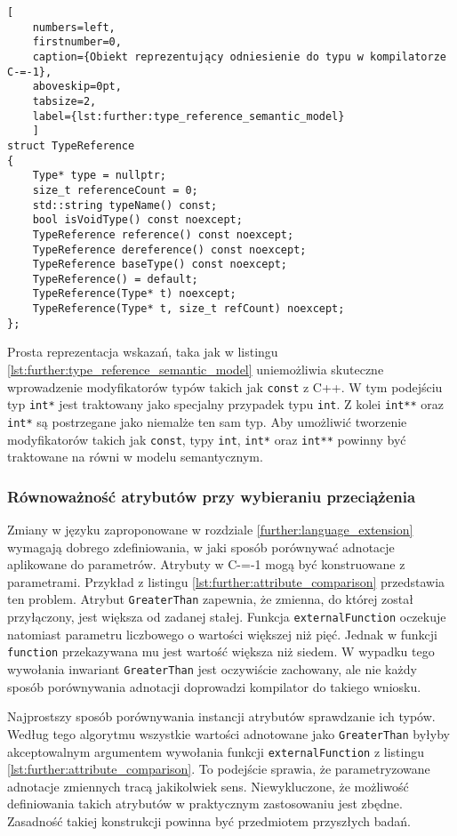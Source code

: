\begin{lstlisting}[
	numbers=left,
	firstnumber=0,
	caption={Obiekt reprezentujący odniesienie do typu w kompilatorze C-=-1},
	aboveskip=0pt,
	tabsize=2,
	label={lst:further:type_reference_semantic_model}
	]
struct TypeReference
{
	Type* type = nullptr;
	size_t referenceCount = 0;
	std::string typeName() const;
	bool isVoidType() const noexcept;
	TypeReference reference() const noexcept;
	TypeReference dereference() const noexcept;
	TypeReference baseType() const noexcept;
	TypeReference() = default;
	TypeReference(Type* t) noexcept;
	TypeReference(Type* t, size_t refCount) noexcept;
};
\end{lstlisting}

Prosta reprezentacja wskazań, taka jak w listingu \ref{lst:further:type_reference_semantic_model} uniemożliwia skuteczne wprowadzenie modyfikatorów typów takich jak \lstinline{const} z C++.
W tym podejściu typ \lstinline{int*} jest traktowany jako specjalny przypadek typu \lstinline{int}.
Z kolei \lstinline{int**} oraz \lstinline{int*} są postrzegane jako niemalże ten sam typ.
Aby umożliwić tworzenie modyfikatorów takich jak \lstinline{const}, typy \lstinline{int}, \lstinline{int*} oraz \lstinline{int**} powinny być traktowane na równi w modelu semantycznym.

\subsubsection{Równoważność atrybutów przy wybieraniu przeciążenia}
\label{further:adnotated_type_system:attribute_equivalence}

Zmiany w języku zaproponowane w rozdziale \ref{further:language_extension} wymagają dobrego zdefiniowania, w jaki sposób porównywać adnotacje aplikowane do parametrów.
Atrybuty w C-=-1 mogą być konstruowane z parametrami.
Przykład z listingu \ref{lst:further:attribute_comparison} przedstawia ten problem.
Atrybut \lstinline{GreaterThan} zapewnia, że zmienna, do której został przyłączony, jest większa od zadanej stałej.
Funkcja \lstinline{externalFunction} oczekuje natomiast parametru liczbowego o wartości większej niż pięć.
Jednak w funkcji \lstinline{function} przekazywana mu jest wartość większa niż siedem.
W wypadku tego wywołania inwariant \lstinline{GreaterThan} jest oczywiście zachowany, ale nie każdy sposób porównywania adnotacji doprowadzi kompilator do takiego wniosku.

Najprostszy sposób porównywania instancji atrybutów sprawdzanie ich typów.
Według tego algorytmu wszystkie wartości adnotowane jako \lstinline{GreaterThan} byłyby akceptowalnym argumentem wywołania funkcji \lstinline{externalFunction} z listingu \ref{lst:further:attribute_comparison}.
To podejście sprawia, że parametryzowane adnotacje zmiennych tracą jakikolwiek sens.
Niewykluczone, że możliwość definiowania takich atrybutów w praktycznym zastosowaniu jest zbędne.
Zasadność takiej konstrukcji powinna być przedmiotem przyszłych badań.

